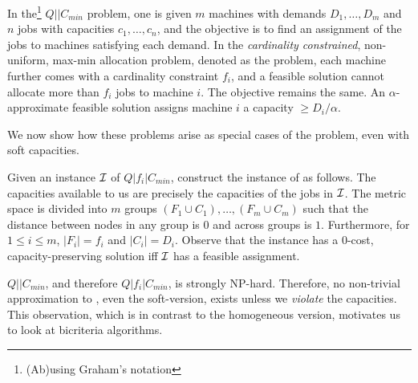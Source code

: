 \begin{definition}
In the\footnote{(Ab)using Graham's notation} $Q||C_{min}$ problem, one is given $m$ machines with demands $D_1,\ldots,D_m$ and $n$ jobs with capacities $c_1,\ldots,c_n$, 
and the objective is to find an assignment of the jobs to machines satisfying each demand. 
In the {\em cardinality constrained}, non-uniform, max-min allocation problem, denoted as the \cckp problem, each machine further comes with a cardinality constraint $f_i$, and a feasible solution cannot allocate more than $f_i$ jobs to machine $i$. The objective remains the same. An $\alpha$-approximate feasible solution assigns machine $i$ a capacity $\geq D_i/\alpha$.
\end{definition}
\noindent
We now show how these problems arise as special cases 
of the \mckc problem, even with soft capacities.
\begin{remark}\label{rem:cckp}
	Given an instance ${\cal I}$ of $Q|f_i|C_{min}$, construct the instance of \mckc as follows. The capacities available to us are precisely the capacities of the jobs in ${\cal I}$.
	The metric space is divided into $m$ groups $(F_1\cup C_1),\ldots,(F_m\cup C_m)$ such that the distance between nodes in any group is $0$ and across groups is $1$.
	Furthermore, for $1\leq i\leq m$, $|F_i| = f_i$ and $|C_i| = D_i$. Observe that the \mckc instance has a $0$-cost, capacity-preserving solution iff ${\cal I}$ has a feasible assignment.
\end{remark}
$Q||C_{min}$, and therefore $Q|f_i|C_{min}$,  is strongly NP-hard. Therefore, no non-trivial approximation to \mckc, even the soft-version, exists unless we {\em violate} the capacities.
This observation, which is in contrast to the homogeneous version, motivates us to look at bicriteria algorithms.
%
%
%
%
%
